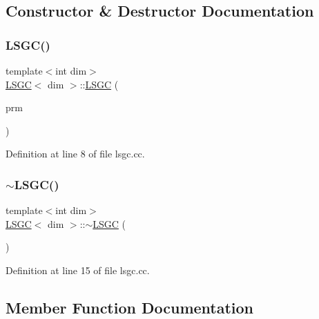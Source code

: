 \subsection{Constructor \& Destructor Documentation}
\mbox{\label{class_l_s_g_c_a9b89f615563bd3583a4a6a36d7b3eb7d}} 
\subsubsection{\texorpdfstring{L\+S\+G\+C()}{LSGC()}}
{\footnotesize\ttfamily template$<$int dim$>$ \\
\hyperlink{class_l_s_g_c}{L\+S\+GC}$<$ dim $>$\+::\hyperlink{class_l_s_g_c}{L\+S\+GC} (\begin{DoxyParamCaption}\item[{Parameter\+Handler \&}]{prm }\end{DoxyParamCaption})}



Definition at line 8 of file lsgc.\+cc.

\mbox{\label{class_l_s_g_c_abcba8afdb075485278288db321776b7e}} 
\subsubsection{\texorpdfstring{$\sim$\+L\+S\+G\+C()}{~LSGC()}}
{\footnotesize\ttfamily template$<$int dim$>$ \\
\hyperlink{class_l_s_g_c}{L\+S\+GC}$<$ dim $>$\+::$\sim$\hyperlink{class_l_s_g_c}{L\+S\+GC} (\begin{DoxyParamCaption}{ }\end{DoxyParamCaption})}



Definition at line 15 of file lsgc.\+cc.



\subsection{Member Function Documentation}
\mbox{\label{class_l_s_g_c_a1d135fb9ca12a9b65b8cc397479fc4d7}} 
